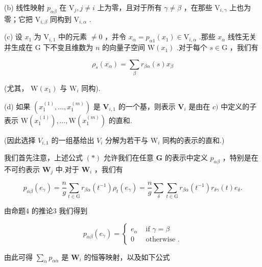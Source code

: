 (b) 线性映射 \({p}_{\alpha \beta }\) 在 \({\mathrm{V}}_{j},j \neq  i\) 上为零，且对于所有 \(\gamma  \neq  \beta\) ，在那些 \({\mathrm{V}}_{i,\gamma }\) 上也为零；它把 \({\mathrm{V}}_{i,\beta }\) 同构到 \({\mathrm{V}}_{i,\alpha }\) .

(c) 设 \({x}_{1}\) 为 \({\mathrm{V}}_{i,1}\) 中的元素 \(\neq  0\) ，并令 \({x}_{\alpha } = {p}_{\alpha 1}\left( {x}_{1}\right)  \in  {\mathrm{V}}_{i,\alpha }\) .那些 \({x}_{\alpha }\) 线性无关并生成在 \(\mathrm{G}\) 下不变且维数为 \(n\) 的向量子空间 \(\mathrm{W}\left( {x}_{1}\right)\) .对于每个 \(s \in  \mathrm{G}\) ，我们有

\[
{\rho }_{s}\left( {x}_{\alpha }\right)  = \mathop{\sum }\limits_{\beta }{r}_{\beta \alpha }\left( s\right) {x}_{\beta }
\]

(尤其， \(\mathrm{W}\left( {x}_{1}\right)\) 与 \({\mathrm{W}}_{i}\) 同构).

(d) 如果 \(\left( {{x}_{1}^{\left( 1\right) },\ldots ,{x}_{1}^{\left( m\right) }}\right)\) 是 \({\mathbf{V}}_{i,1}\) 的一个基，则表示 \({\mathbf{V}}_{i}\) 是由在 \(c)\) 中定义的子表示 \(\mathrm{W}\left( {x}_{1}^{\left( 1\right) }\right) ,\ldots ,\mathrm{W}\left( {x}_{1}^{\left( m\right) }\right)\) 的直和.

(因此选择 \({V}_{i,1}\) 的一组基给出 \({V}_{i}\) 分解为若干与 \({\mathrm{W}}_{i}\) 同构的表示的直和.)

我们首先注意，上述公式 \(\left( *\right)\) 允许我们在任意 \(\mathbf{G}\) 的表示中定义 \({p}_{\alpha \beta }\) ，特别是在不可约表示 \({\mathbf{W}}_{j}\) 中.对于 \({\mathbf{W}}_{i}\) ，我们有

\[
{p}_{\alpha \beta }\left( {e}_{\gamma }\right)  = \frac{n}{g}\mathop{\sum }\limits_{{t \in  \mathrm{G}}}{r}_{\beta \alpha }\left( {t}^{-1}\right) {\rho }_{t}\left( {e}_{\gamma }\right)  = \frac{n}{g}\mathop{\sum }\limits_{\delta }\mathop{\sum }\limits_{{t \in  \mathrm{G}}}{r}_{\beta \alpha }\left( {t}^{-1}\right) {r}_{\delta \gamma }\left( t\right) {e}_{\delta }.
\]

由命题4 的推论3 我们得到

\[
{p}_{\alpha \beta }\left( {e}_{\gamma }\right)  = \left\{  \begin{array}{ll} {e}_{\alpha } & \text{ if }\gamma  = \beta \\  0 & \text{ otherwise }. \end{array}\right.
\]

由此可得 \(\mathop{\sum }\limits_{\alpha }{p}_{\alpha \alpha }\) 是 \({\mathbf{W}}_{i}\) 的恒等映射，以及如下公式

